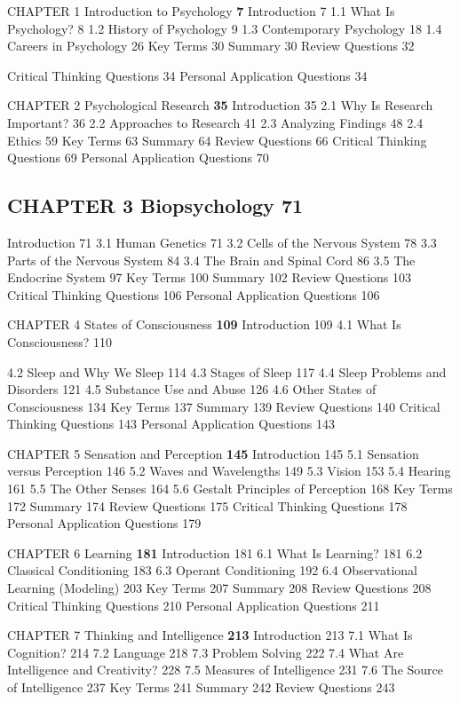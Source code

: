 \documentclass[11pt]{article}
\begin{document}
CHAPTER 1  Introduction to Psychology \textbf{7 } Introduction  7  1.1 What Is Psychology?  8  1.2 History of Psychology  9  1.3 Contemporary Psychology  18  1.4 Careers in Psychology  26  Key Terms  30  Summary  30  Review Questions  32

Critical Thinking Questions  34  Personal Application Questions  34

CHAPTER 2  Psychological Research \textbf{35 } Introduction  35  2.1 Why Is Research Important?  36  2.2 Approaches to Research  41  2.3 Analyzing Findings  48  2.4 Ethics  59  Key Terms  63  Summary  64  Review Questions  66  Critical Thinking Questions  69  Personal Application Questions  70

\subsection*{CHAPTER 3  Biopsychology \textbf{71 }}
Introduction  71  3.1 Human Genetics  71  3.2 Cells of the Nervous System  78  3.3 Parts of the Nervous System  84  3.4 The Brain and Spinal Cord  86  3.5 The Endocrine System  97  Key Terms  100  Summary  102  Review Questions  103  Critical Thinking Questions  106  Personal Application Questions  106

CHAPTER 4  States of Consciousness \textbf{109 } Introduction  109  4.1 What Is Consciousness?  110



4.2 Sleep and Why We Sleep  114  4.3 Stages of Sleep  117  4.4 Sleep Problems and Disorders  121  4.5 Substance Use and Abuse  126  4.6 Other States of Consciousness  134  Key Terms  137  Summary  139  Review Questions  140  Critical Thinking Questions  143  Personal Application Questions  143

CHAPTER 5  Sensation and Perception \textbf{145 } Introduction  145  5.1 Sensation versus Perception  146  5.2 Waves and Wavelengths  149  5.3 Vision  153  5.4 Hearing  161  5.5 The Other Senses  164  5.6 Gestalt Principles of Perception  168  Key Terms  172  Summary  174  Review Questions  175  Critical Thinking Questions  178  Personal Application Questions  179

CHAPTER 6  Learning \textbf{181 } Introduction  181  6.1 What Is Learning?  181  6.2 Classical Conditioning  183  6.3 Operant Conditioning  192  6.4 Observational Learning (Modeling)  203  Key Terms  207  Summary  208  Review Questions  208  Critical Thinking Questions  210  Personal Application Questions  211

CHAPTER 7  Thinking and Intelligence \textbf{213 } Introduction  213  7.1 What Is Cognition?  214  7.2 Language  218  7.3 Problem Solving  222  7.4 What Are Intelligence and Creativity?  228  7.5 Measures of Intelligence  231  7.6 The Source of Intelligence  237  Key Terms  241  Summary  242  Review Questions  243
\end{document}

